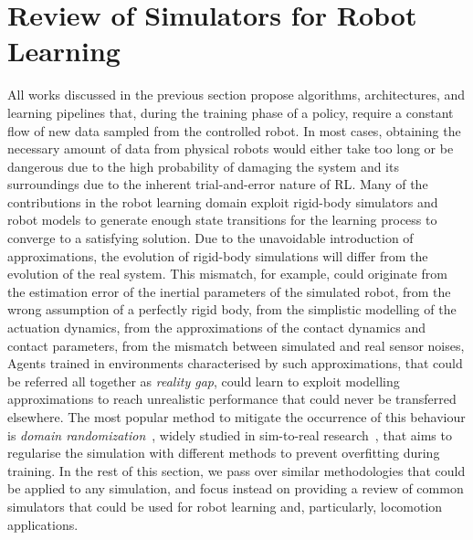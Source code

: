\section{Review of Simulators for Robot Learning}
\label{sec:review_simulators_robot_learning}

All works discussed in the previous section propose algorithms, architectures, and learning pipelines that, during the training phase of a policy, require a constant flow of new data sampled from the controlled robot.
In most cases, obtaining the necessary amount of data from physical robots would either take too long or be dangerous due to the high probability of damaging the system and its surroundings due to the inherent trial-and-error nature of \ac{RL}.
Many of the contributions in the robot learning domain exploit rigid-body simulators and robot models to generate enough state transitions for the learning process to converge to a satisfying solution.
Due to the unavoidable introduction of approximations, the evolution of rigid-body simulations will differ from the evolution of the real system.
This mismatch, for example, could originate from the estimation error of the inertial parameters of the simulated robot, from the wrong assumption of a perfectly rigid body, from the simplistic modelling of the actuation dynamics, from the approximations of the contact dynamics and contact parameters, from the mismatch between simulated and real sensor noises, \etc
Agents trained in environments characterised by such approximations, that could be referred all together as \emph{reality gap}, could learn to exploit modelling approximations to reach unrealistic performance that could never be transferred elsewhere.
The most popular method to mitigate the occurrence of this behaviour is \emph{domain randomization}~\parencite{peng_sim--real_2018, muratore_robot_2022}, widely studied in sim-to-real research~\parencite{zhao_sim--real_2020}, that aims to regularise the simulation with different methods to prevent overfitting during training.
In the rest of this section, we pass over similar methodologies that could be applied to any simulation, and focus instead on providing a review of common simulators that could be used for robot learning and, particularly, locomotion applications.


